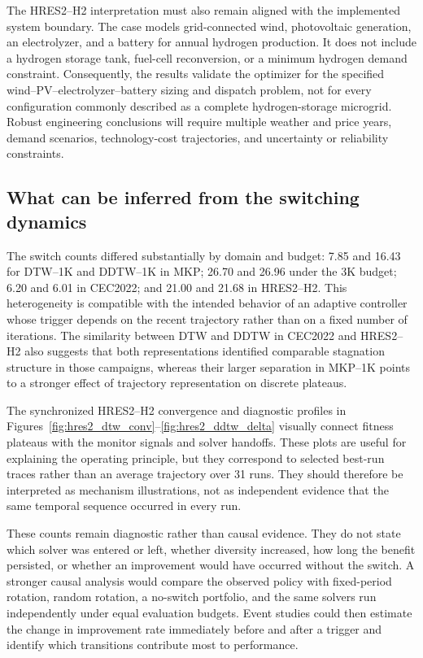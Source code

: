 \documentclass[review]{elsarticle}
\begin{document}
The HRES2--H2 interpretation must also remain aligned with the implemented
system boundary. The case models grid-connected wind, photovoltaic generation,
an electrolyzer, and a battery for annual hydrogen production. It does not
include a hydrogen storage tank, fuel-cell reconversion, or a minimum hydrogen
demand constraint. Consequently, the results validate the optimizer for the
specified wind--PV--electrolyzer--battery sizing and dispatch problem, not for
every configuration commonly described as a complete hydrogen-storage
microgrid. Robust engineering conclusions will require multiple weather and
price years, demand scenarios, technology-cost trajectories, and uncertainty
or reliability constraints.

\subsection{What can be inferred from the switching dynamics}
\label{sec:discussion-switching}

The switch counts differed substantially by domain and budget: 7.85 and 16.43
for DTW--1K and DDTW--1K in MKP; 26.70 and 26.96 under the 3K budget; 6.20 and
6.01 in CEC2022; and 21.00 and 21.68 in HRES2--H2. This heterogeneity is
compatible with the intended behavior of an adaptive controller whose trigger
depends on the recent trajectory rather than on a fixed number of iterations.
The similarity between DTW and DDTW in CEC2022 and HRES2--H2 also suggests that
both representations identified comparable stagnation structure in those
campaigns, whereas their larger separation in MKP--1K points to a stronger
effect of trajectory representation on discrete plateaus.

The synchronized HRES2--H2 convergence and diagnostic profiles in
Figures~\ref{fig:hres2_dtw_conv}--\ref{fig:hres2_ddtw_delta} visually connect
fitness plateaus with the monitor signals and solver handoffs. These plots are
useful for explaining the operating principle, but they correspond to selected
best-run traces rather than an average trajectory over 31 runs. They should
therefore be interpreted as mechanism illustrations, not as independent
evidence that the same temporal sequence occurred in every run.

These counts remain diagnostic rather than causal evidence. They do not state
which solver was entered or left, whether diversity increased, how long the
benefit persisted, or whether an improvement would have occurred without the
switch. A stronger causal analysis would compare the observed policy with
fixed-period rotation, random rotation, a no-switch portfolio, and the same
solvers run independently under equal evaluation budgets. Event studies could
then estimate the change in improvement rate immediately before and after a
trigger and identify which transitions contribute most to performance.
\end{document}
